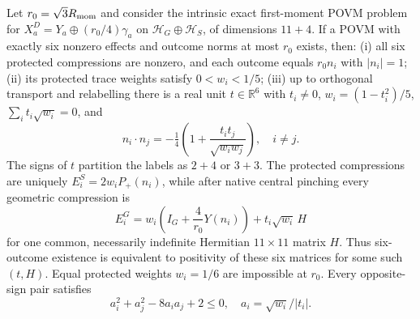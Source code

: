 \documentclass[12pt,a4paper]{article}
\begin{document}
\begin{theorem}
\label{p2c:thm:vGC18-six-endpoint-rigidity}
Let $r_0=\sqrt3R_{\rm mom}$ and consider the intrinsic exact first-moment
POVM problem for $X_a^D=Y_a\oplus(r_0/4)\gamma_a$ on
$\mathcal H_G\oplus\mathcal H_S$, of dimensions $11+4$.
If a POVM with exactly six nonzero effects and outcome norms at most $r_0$
exists, then: (i) all six protected compressions are nonzero, and each
outcome equals $r_0n_i$ with $|n_i|=1$; (ii) its protected trace weights
satisfy $0<w_i<1/5$; (iii) up to orthogonal transport and relabelling there
is a real unit $t\in\mathbb R^6$ with $t_i\ne0$,
$w_i=(1-t_i^2)/5$, $\sum_i t_i\sqrt{w_i}=0$, and
\[
 n_i\cdot n_j=-\tfrac14\left(1+\frac{t_it_j}{\sqrt{w_iw_j}}\right),\quad i\ne j.
\]
The signs of $t$ partition the labels as $2+4$ or $3+3$. The protected
compressions are uniquely $E_i^S=2w_iP_+(n_i)$, while after native
central pinching every geometric compression is
\[
 E_i^G=w_i\left(I_G+\frac4{r_0}Y(n_i)\right)+t_i\sqrt{w_i}\,H
\]
for one common, necessarily indefinite Hermitian $11\times11$ matrix $H$.
Thus six-outcome existence is equivalent to positivity of these six
matrices for some such $(t,H)$. Equal protected weights $w_i=1/6$
are impossible at $r_0$. Every opposite-sign pair satisfies
\[\boxed{a_i^2+a_j^2-8a_ia_j+2\le0},\quad a_i=\sqrt{w_i}/|t_i|.\]
\end{theorem}
\end{document}
